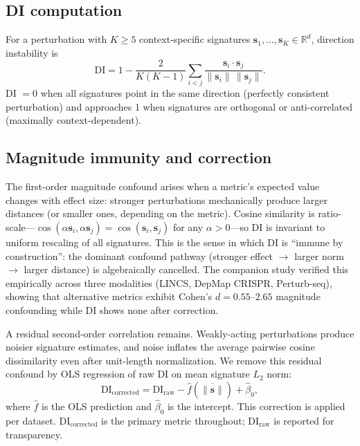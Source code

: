\documentclass[11pt]{article}
\begin{document}
\subsection{DI computation}

For a perturbation with $K \geq 5$ context-specific signatures
$\mathbf{s}_1, \ldots, \mathbf{s}_K \in \mathbb{R}^d$, direction
instability is
\begin{equation}
\mathrm{DI} = 1 - \frac{2}{K(K-1)} \sum_{i < j}
\frac{\mathbf{s}_i \cdot \mathbf{s}_j}
     {\|\mathbf{s}_i\| \, \|\mathbf{s}_j\|}.
\label{eq:di}
\end{equation}
DI $= 0$ when all signatures point in the same direction (perfectly
consistent perturbation) and approaches 1 when signatures are
orthogonal or anti-correlated (maximally context-dependent).

\subsection{Magnitude immunity and correction}

The first-order magnitude confound arises when a metric's expected value
changes with effect size: stronger perturbations mechanically produce
larger distances (or smaller ones, depending on the metric).  Cosine
similarity is ratio-scale---$\cos(\alpha \mathbf{s}_i,
\alpha \mathbf{s}_j) = \cos(\mathbf{s}_i, \mathbf{s}_j)$ for any
$\alpha > 0$---so DI is invariant to uniform rescaling of all
signatures.  This is the sense in which DI is ``immune by
construction'': the dominant confound pathway (stronger effect
$\to$ larger norm $\to$ larger distance) is algebraically cancelled.
The companion study \citep{tower2026confound} verified this empirically
across three modalities (LINCS, DepMap CRISPR, Perturb-seq), showing
that alternative metrics exhibit Cohen's $d = 0.55$--$2.65$ magnitude
confounding while DI shows none after correction.

A residual second-order correlation remains.  Weakly-acting
perturbations produce noisier signature estimates, and noise inflates
the average pairwise cosine dissimilarity even after unit-length
normalization.  We remove this residual confound by OLS regression of
raw DI on mean signature $L_2$ norm:
\begin{equation}
\mathrm{DI}_{\mathrm{corrected}} = \mathrm{DI}_{\mathrm{raw}}
  - \hat{f}(\overline{\|\mathbf{s}\|}) + \hat{\beta}_0,
\label{eq:magnitude}
\end{equation}
where $\hat{f}$ is the OLS prediction and $\hat{\beta}_0$ is the
intercept.  This correction is applied per dataset.
$\mathrm{DI}_{\mathrm{corrected}}$ is the primary metric throughout;
$\mathrm{DI}_{\mathrm{raw}}$ is reported for transparency.
\end{document}
